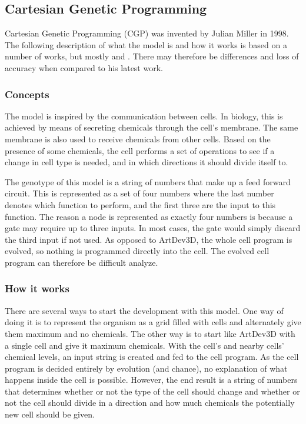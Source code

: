 \subsection{Cartesian Genetic Programming}
Cartesian Genetic Programming (CGP) was invented by Julian Miller in 1998. The following description of what the model is and how it works is based on a number of works, but mostly \cite{mteurogp2000} and \cite{ecal2003}. There may therefore be differences and loss of accuracy when compared to his latest work.

\subsubsection{Concepts}
The model is inspired by the communication between cells. In biology, this is achieved by means of secreting chemicals through the cell's membrane. The same membrane is also used to receive chemicals from other cells. Based on the presence of some chemicals, the cell performs a set of operations to see if a change in cell type is needed, and in which directions it should divide itself to.

The genotype of this model is a string of numbers that make up a feed forward circuit. This is represented as a set of four numbers where the last number denotes which function to perform, and the first three are the input to this function. The reason a node is represented as exactly four numbers is because a gate may require up to three inputs. In most cases, the gate would simply discard the third input if not used. As opposed to ArtDev3D, the whole cell program is evolved, so nothing is programmed directly into the cell. The evolved cell program can therefore be difficult analyze.

\subsubsection{How it works}
There are several ways to start the development with this model. One way of doing it is to represent the organism as a grid filled with cells and alternately give them maximum and no chemicals. The other way is to start like ArtDev3D with a single cell and give it maximum chemicals. With the cell's and nearby cells' chemical levels, an input string is created and fed to the cell program. As the cell program is decided entirely by evolution (and chance), no explanation of what happens inside the cell is possible. However, the end result is a string of numbers that determines whether or not the type of the cell should change and whether or not the cell should divide in a direction and how much chemicals the potentially new cell should be given.


